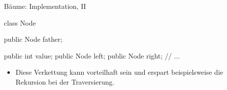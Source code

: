 \begin{frame}[fragile]{Bäume: Implementation, II}
    \pause\begin{minipage}{.4\linewidth}
\small%
\begin{plainjava}
class Node {
    public Node father;

    public int value;
    public Node left;
    public Node right;
    // ...
}
\end{plainjava}
    \end{minipage}\hfill{}\pause\begin{minipage}{.55\linewidth}%
\centering{}
\end{minipage}\vfill
    \begin{itemize}[<+(1)->]
        \widei
        \item Diese Verkettung kann vorteilhaft sein und erspart beispielsweise die Rekursion bei der Traversierung.
    \end{itemize}
\end{frame}

